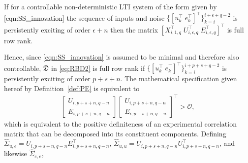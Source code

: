 \setcounter{thm}{0}
\begin{cor}
    If for a controllable non-deterministic \ac{LTI} system of the form given by \eqref{eqn:SS_innovation} the sequence of inputs and noise $\{[u_k^\top\;e_k^\top]^\top\}_{k=i}^{i+\epsilon+q-2}$ is persistently exciting of order $\epsilon+n$ then the matrix $\left[X_{i,1,q}^\top\;U_{i,\epsilon,q}^\top\;E_{i,\epsilon,q}^\top\right]^\top$ is full row rank.
\end{cor}
Hence, since \eqref{eqn:SS_innovation} is assumed to be minimal and therefore also controllable, $\mathfrak{D}$ in \eqref{eq:RBD2} is full row rank if $\{[u_k^\top\;e_k^\top]^\top\}_{k=i}^{i+p+s+q-2}$ is persistently exciting of order $p+s+n$. The mathematical specification given hereof by Definition~\ref{def:PE} is equivalent to
\begin{align}
    \begin{bmatrix}
        U_{i,p+s+n,q-n}\\
        E_{i,p+s+n,q-n}
    \end{bmatrix}
    \begin{bmatrix}
        U_{i,p+s+n,q-n}\\
        E_{i,p+s+n,q-n}
    \end{bmatrix}^\top > \mathcal{O},
\end{align}
which is equivalent to the positive definiteness of an experimental correlation matrix that can be decomposed into its constituent components. Defining  $\widehat{\Sigma}_{u,e}=U_{i,p+s+n,q-n}E_{i,p+s+n,q-n}^\top$, $\widehat{\Sigma}_{u,u}=U_{i,p+s+n,q-n}U_{i,p+s+n,q-n}^\top$, and likewise $\widehat{\Sigma}_{e,e}$, 


